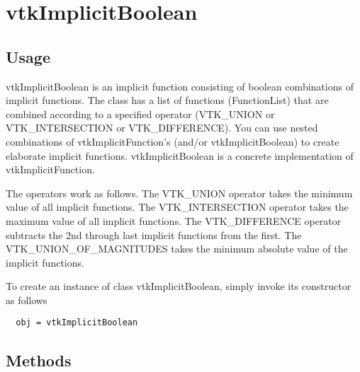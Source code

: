 \section{vtkImplicitBoolean}

\subsection{Usage}

 vtkImplicitBoolean is an implicit function consisting of boolean
 combinations of implicit functions. The class has a list of functions
 (FunctionList) that are combined according to a specified operator
 (VTK\_UNION or VTK\_INTERSECTION or VTK\_DIFFERENCE). You can use nested
 combinations of vtkImplicitFunction's (and/or vtkImplicitBoolean) to create
 elaborate implicit functions.  vtkImplicitBoolean is a concrete
 implementation of vtkImplicitFunction.

 The operators work as follows. The VTK\_UNION operator takes the minimum
 value of all implicit functions. The VTK\_INTERSECTION operator takes the
 maximum value of all implicit functions. The VTK\_DIFFERENCE operator
 subtracts the 2nd through last implicit functions from the first. The
 VTK\_UNION\_OF\_MAGNITUDES takes the minimum absolute value of the 
 implicit functions.

To create an instance of class vtkImplicitBoolean, simply
invoke its constructor as follows
\begin{verbatim}
  obj = vtkImplicitBoolean
\end{verbatim}
\subsection{Methods}


